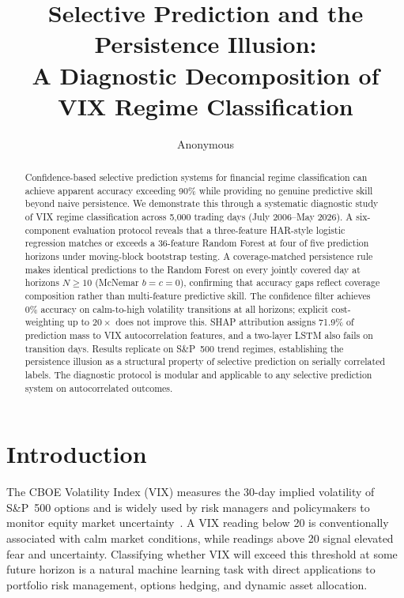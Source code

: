 \documentclass[runningheads]{llncs}
\begin{document}
\title{Selective Prediction and the Persistence Illusion:\\
A Diagnostic Decomposition of VIX Regime Classification}


\author{Anonymous}

\maketitle

\begin{abstract}
Confidence-based selective prediction systems for financial regime
classification can achieve apparent accuracy exceeding 90\% while providing
no genuine predictive skill beyond naive persistence. We demonstrate this
through a systematic diagnostic study of VIX regime classification across
5{,}000 trading days (July 2006--May 2026). A six-component evaluation
protocol reveals that a three-feature HAR-style logistic regression matches
or exceeds a 36-feature Random Forest at four of five prediction horizons
under moving-block bootstrap testing. A coverage-matched persistence rule
makes identical predictions to the Random Forest on every jointly covered day
at horizons $N \geq 10$ (McNemar $b = c = 0$), confirming that accuracy
gaps reflect coverage composition rather than multi-feature predictive skill.
The confidence filter achieves 0\% accuracy on calm-to-high volatility
transitions at all horizons; explicit cost-weighting up to $20\times$ does
not improve this. SHAP attribution assigns 71.9\% of prediction mass to
VIX autocorrelation features, and a two-layer LSTM also fails on transition
days. Results replicate on S\&P~500 trend regimes, establishing the
persistence illusion as a structural property of selective prediction on
serially correlated labels. The diagnostic protocol is modular and applicable
to any selective prediction system on autocorrelated outcomes.
\end{abstract}


\section{Introduction}

The CBOE Volatility Index (VIX) measures the 30-day implied volatility of
S\&P~500 options and is widely used by risk managers and policymakers to
monitor equity market uncertainty~\cite{whaley2009}. A VIX reading below 20
is conventionally associated with calm market conditions, while readings
above 20 signal elevated fear and uncertainty. Classifying whether VIX will
exceed this threshold at some future horizon is a natural machine learning
task with direct applications to portfolio risk management, options hedging,
and dynamic asset allocation.
\end{document}
